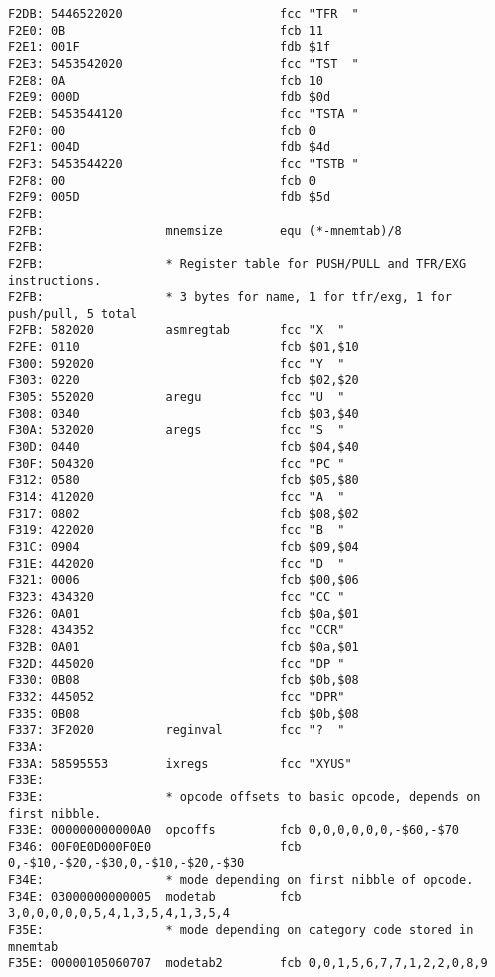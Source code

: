 {\begin{verbatim}
F2DB: 5446522020                      fcc "TFR  "
F2E0: 0B                              fcb 11
F2E1: 001F                            fdb $1f
F2E3: 5453542020                      fcc "TST  "
F2E8: 0A                              fcb 10
F2E9: 000D                            fdb $0d
F2EB: 5453544120                      fcc "TSTA "
F2F0: 00                              fcb 0
F2F1: 004D                            fdb $4d
F2F3: 5453544220                      fcc "TSTB "
F2F8: 00                              fcb 0
F2F9: 005D                            fdb $5d
F2FB:                 
F2FB:                 mnemsize        equ (*-mnemtab)/8
F2FB:                 
F2FB:                 * Register table for PUSH/PULL and TFR/EXG instructions.
F2FB:                 * 3 bytes for name, 1 for tfr/exg, 1 for push/pull, 5 total 
F2FB: 582020          asmregtab       fcc "X  "
F2FE: 0110                            fcb $01,$10
F300: 592020                          fcc "Y  "
F303: 0220                            fcb $02,$20
F305: 552020          aregu           fcc "U  "
F308: 0340                            fcb $03,$40
F30A: 532020          aregs           fcc "S  "
F30D: 0440                            fcb $04,$40
F30F: 504320                          fcc "PC "
F312: 0580                            fcb $05,$80
F314: 412020                          fcc "A  "
F317: 0802                            fcb $08,$02
F319: 422020                          fcc "B  "
F31C: 0904                            fcb $09,$04
F31E: 442020                          fcc "D  "
F321: 0006                            fcb $00,$06
F323: 434320                          fcc "CC "
F326: 0A01                            fcb $0a,$01
F328: 434352                          fcc "CCR"
F32B: 0A01                            fcb $0a,$01
F32D: 445020                          fcc "DP "
F330: 0B08                            fcb $0b,$08
F332: 445052                          fcc "DPR"
F335: 0B08                            fcb $0b,$08
F337: 3F2020          reginval        fcc "?  "
F33A:                 
F33A: 58595553        ixregs          fcc "XYUS"
F33E:                 
F33E:                 * opcode offsets to basic opcode, depends on first nibble. 
F33E: 000000000000A0  opcoffs         fcb 0,0,0,0,0,0,-$60,-$70
F346: 00F0E0D000F0E0                  fcb 0,-$10,-$20,-$30,0,-$10,-$20,-$30
F34E:                 * mode depending on first nibble of opcode.
F34E: 03000000000005  modetab         fcb 3,0,0,0,0,0,5,4,1,3,5,4,1,3,5,4
F35E:                 * mode depending on category code stored in mnemtab
F35E: 00000105060707  modetab2        fcb 0,0,1,5,6,7,7,1,2,2,0,8,9

\end{verbatim}}
